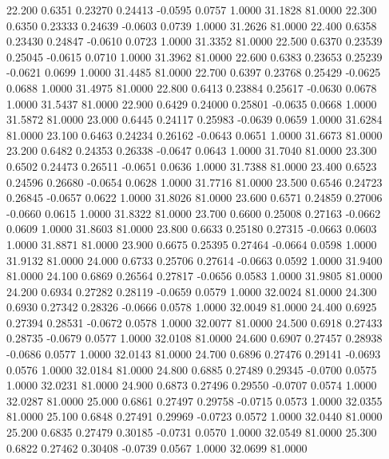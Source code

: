   22.200   0.6351   0.23270   0.24413  -0.0595   0.0757   1.0000  31.1828  81.0000
  22.300   0.6350   0.23333   0.24639  -0.0603   0.0739   1.0000  31.2626  81.0000
  22.400   0.6358   0.23430   0.24847  -0.0610   0.0723   1.0000  31.3352  81.0000
  22.500   0.6370   0.23539   0.25045  -0.0615   0.0710   1.0000  31.3962  81.0000
  22.600   0.6383   0.23653   0.25239  -0.0621   0.0699   1.0000  31.4485  81.0000
  22.700   0.6397   0.23768   0.25429  -0.0625   0.0688   1.0000  31.4975  81.0000
  22.800   0.6413   0.23884   0.25617  -0.0630   0.0678   1.0000  31.5437  81.0000
  22.900   0.6429   0.24000   0.25801  -0.0635   0.0668   1.0000  31.5872  81.0000
  23.000   0.6445   0.24117   0.25983  -0.0639   0.0659   1.0000  31.6284  81.0000
  23.100   0.6463   0.24234   0.26162  -0.0643   0.0651   1.0000  31.6673  81.0000
  23.200   0.6482   0.24353   0.26338  -0.0647   0.0643   1.0000  31.7040  81.0000
  23.300   0.6502   0.24473   0.26511  -0.0651   0.0636   1.0000  31.7388  81.0000
  23.400   0.6523   0.24596   0.26680  -0.0654   0.0628   1.0000  31.7716  81.0000
  23.500   0.6546   0.24723   0.26845  -0.0657   0.0622   1.0000  31.8026  81.0000
  23.600   0.6571   0.24859   0.27006  -0.0660   0.0615   1.0000  31.8322  81.0000
  23.700   0.6600   0.25008   0.27163  -0.0662   0.0609   1.0000  31.8603  81.0000
  23.800   0.6633   0.25180   0.27315  -0.0663   0.0603   1.0000  31.8871  81.0000
  23.900   0.6675   0.25395   0.27464  -0.0664   0.0598   1.0000  31.9132  81.0000
  24.000   0.6733   0.25706   0.27614  -0.0663   0.0592   1.0000  31.9400  81.0000
  24.100   0.6869   0.26564   0.27817  -0.0656   0.0583   1.0000  31.9805  81.0000
  24.200   0.6934   0.27282   0.28119  -0.0659   0.0579   1.0000  32.0024  81.0000
  24.300   0.6930   0.27342   0.28326  -0.0666   0.0578   1.0000  32.0049  81.0000
  24.400   0.6925   0.27394   0.28531  -0.0672   0.0578   1.0000  32.0077  81.0000
  24.500   0.6918   0.27433   0.28735  -0.0679   0.0577   1.0000  32.0108  81.0000
  24.600   0.6907   0.27457   0.28938  -0.0686   0.0577   1.0000  32.0143  81.0000
  24.700   0.6896   0.27476   0.29141  -0.0693   0.0576   1.0000  32.0184  81.0000
  24.800   0.6885   0.27489   0.29345  -0.0700   0.0575   1.0000  32.0231  81.0000
  24.900   0.6873   0.27496   0.29550  -0.0707   0.0574   1.0000  32.0287  81.0000
  25.000   0.6861   0.27497   0.29758  -0.0715   0.0573   1.0000  32.0355  81.0000
  25.100   0.6848   0.27491   0.29969  -0.0723   0.0572   1.0000  32.0440  81.0000
  25.200   0.6835   0.27479   0.30185  -0.0731   0.0570   1.0000  32.0549  81.0000
  25.300   0.6822   0.27462   0.30408  -0.0739   0.0567   1.0000  32.0699  81.0000
